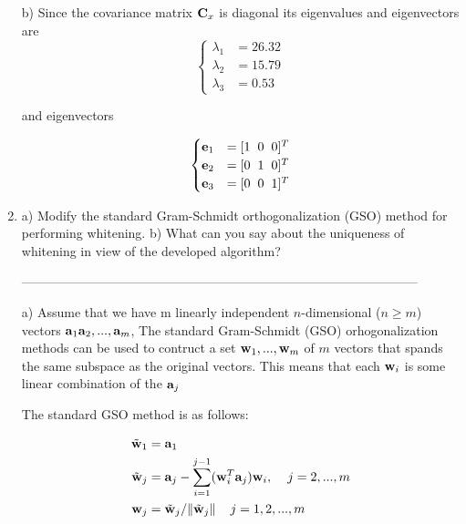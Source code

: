 \documentclass[10pt]{article}
\begin{document}
\begin{enumerate}
b) Since the covariance matrix $\mathbf{C}_x$ is diagonal its
eigenvalues and eigenvectors are
\[
\begin{cases}
\lambda_1 &= 26.32 \\
\lambda_2 &= 15.79 \\
\lambda_3 &= 0.53
\end{cases}
\]

and eigenvectors

\[
\begin{cases}
\mathbf{e}_1 &= [1 \hspace{2mm} 0 \hspace{2mm} 0]^T \\
\mathbf{e}_2 &= [0 \hspace{2mm} 1 \hspace{2mm} 0]^T \\
\mathbf{e}_3 &= [0 \hspace{2mm} 0 \hspace{2mm} 1]^T
\end{cases}
\]

\vspace{2mm}

\vspace{2cm}
\item  a) Modify the standard Gram-Schmidt orthogonalization (GSO) method for
performing whitening. b) What can you say about the uniqueness of whitening in view of the
developed algorithm?

---------------------------------------------------------------------------------------------

a) Assume that we have m linearly independent $n$-dimensional ($n\geq
m$) vectors $\mathbf{a}_1 \mathbf{a}_2, ..., \mathbf{a}_m$, The standard Gram-Schmidt (GSO)
orhogonalization methods can be used to contruct a set $\mathbf{w}_1, ..., \mathbf{w}_m$
of $m$ vectors that spands the same subspace as the original
vectors. This means that each $\mathbf{w}_i$ is some linear combination of the
$\mathbf{a}_j$

The standard GSO method is as follows:

\[
\begin{split}
\tilde{\mathbf{w}}_1 &= \mathbf{a}_1 \\
\tilde{\mathbf{w}}_j &= \mathbf{a}_j - \sum_{i=1}^{j-1} (\mathbf{w}_i^T
\mathbf{a}_j)\mathbf{w}_i, \hspace{4mm} j=2,...,m \\
\mathbf{w}_j &= \tilde{\mathbf{w}}_j / \| \tilde{\mathbf{w}}_j \| \hspace{4mm} j=1,2,...,m
\end{split}
\]


\end{enumerate}
\end{document}
